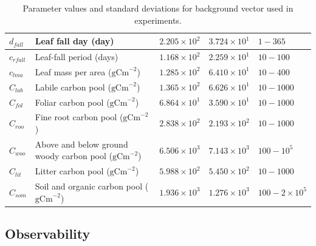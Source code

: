 \begin{table}[ht]
\begin{center}
\begin{tabular}{| l | p{4.5cm} | p{1.7cm} | p{1.7cm} | p{1.7cm} |}
$d_{fall}$ & Leaf fall day (day) & $2.205\times 10^{2}$ & $3.724\times 10^{1}$ & $1 - 365$ \\ \hline
$c_{rfall}$ & Leaf-fall period (days) & $1.168\times 10^{2}$ & $2.259\times 10^{1}$ & $10 - 100$ \\ \hline
$c_{lma}$ & Leaf mass per area ($\text{gCm}^{-2}$) & $1.285\times 10^{2}$ & $6.410\times 10^{1}$ & $10 - 400$ \\ \hline
$C_{lab}$ & Labile carbon pool ($\text{gCm}^{-2}$) & $1.365\times 10^{2}$ & $6.626\times 10^{1}$ & $10 - 1000$ \\ \hline
$C_{fol}$ & Foliar carbon pool ($\text{gCm}^{-2}$) & $6.864\times 10^{1}$ & $3.590\times 10^{1}$ & $10 - 1000$ \\ \hline
$C_{roo}$ & Fine root carbon pool ($\text{gCm}^{-2}$) & $2.838\times 10^{2}$ & $2.193\times 10^{2}$ & $10 - 1000$ \\ \hline
$C_{woo}$ & Above and below ground woody carbon pool ($\text{gCm}^{-2}$) & $6.506\times 10^{3}$ & $7.143\times 10^{3}$ & $100 - 10^{5}$ \\ \hline
$C_{lit}$ & Litter carbon pool ($\text{gCm}^{-2}$) & $5.988\times 10^{2}$ & $5.450\times 10^{2}$ & $10 - 1000$ \\ \hline
$C_{som}$ & Soil and organic carbon pool ($\text{gCm}^{-2}$) & $1.936\times 10^{3}$ & $1.276\times 10^{3}$ & $100 - 2 \times 10^{5}$  \\ \hline
	\end{tabular}
	\caption{Parameter values and standard deviations for background vector used in experiments.}
	\label{chap5:table:xbvars}
\end{center} 
\end{table}

\subsection{Observability}

